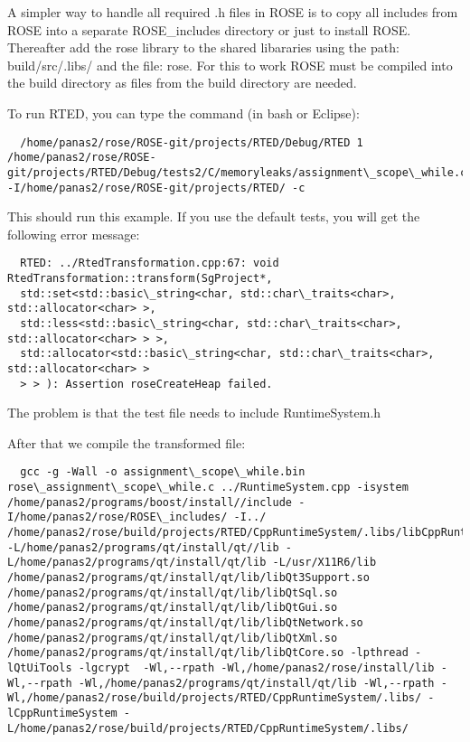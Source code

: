A simpler way to handle all required .h files in ROSE is to copy all includes from ROSE into a separate ROSE\_includes directory or just to install ROSE.
Thereafter add the rose library to the shared libararies using the path: build/src/.libs/ and the file: rose.
For this to work ROSE must be compiled into the build directory as files from the build directory are needed.

To run RTED, you can type the command (in bash or Eclipse):

\begin{verbatim}
  /home/panas2/rose/ROSE-git/projects/RTED/Debug/RTED 1  /home/panas2/rose/ROSE-git/projects/RTED/Debug/tests2/C/memoryleaks/assignment\_scope\_while.c  -I/home/panas2/rose/ROSE-git/projects/RTED/ -c
\end{verbatim}

This should run this example. If you use the default tests, you will get the following error message: 

\begin{verbatim}
  RTED: ../RtedTransformation.cpp:67: void RtedTransformation::transform(SgProject*,
  std::set<std::basic\_string<char, std::char\_traits<char>, std::allocator<char> >, 
  std::less<std::basic\_string<char, std::char\_traits<char>, std::allocator<char> > >, 
  std::allocator<std::basic\_string<char, std::char\_traits<char>, std::allocator<char> > 
  > > ): Assertion roseCreateHeap failed.
\end{verbatim}

The problem is that the test file needs to include RuntimeSystem.h

After that we compile the transformed file:

\begin{verbatim}
  gcc -g -Wall -o assignment\_scope\_while.bin rose\_assignment\_scope\_while.c ../RuntimeSystem.cpp -isystem /home/panas2/programs/boost/install//include -I/home/panas2/rose/ROSE\_includes/ -I../ /home/panas2/rose/build/projects/RTED/CppRuntimeSystem/.libs/libCppRuntimeSystem.so.0 -L/home/panas2/programs/qt/install/qt//lib -L/home/panas2/programs/qt/install/qt/lib -L/usr/X11R6/lib /home/panas2/programs/qt/install/qt/lib/libQt3Support.so /home/panas2/programs/qt/install/qt/lib/libQtSql.so /home/panas2/programs/qt/install/qt/lib/libQtGui.so /home/panas2/programs/qt/install/qt/lib/libQtNetwork.so /home/panas2/programs/qt/install/qt/lib/libQtXml.so /home/panas2/programs/qt/install/qt/lib/libQtCore.so -lpthread -lQtUiTools -lgcrypt  -Wl,--rpath -Wl,/home/panas2/rose/install/lib -Wl,--rpath -Wl,/home/panas2/programs/qt/install/qt/lib -Wl,--rpath -Wl,/home/panas2/rose/build/projects/RTED/CppRuntimeSystem/.libs/ -lCppRuntimeSystem -L/home/panas2/rose/build/projects/RTED/CppRuntimeSystem/.libs/
\end{verbatim}

